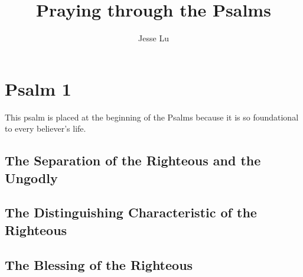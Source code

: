 \documentclass[a5paper]{book}
\title{Praying through the Psalms}
\author{Jesse Lu}
\begin{document}
\maketitle
\chapter{Psalm 1}
This psalm is placed at the beginning of the Psalms
    because it is so foundational to every believer's life.
\section{The Separation of the Righteous and the Ungodly}
\section{The Distinguishing Characteristic of the Righteous}
\section{The Blessing of the Righteous}
\end{document}
